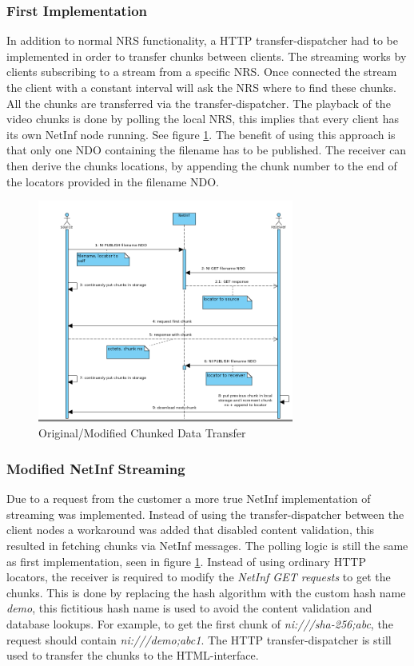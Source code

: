 \subsubsection{First Implementation}
In addition to normal NRS functionality, a HTTP transfer-dispatcher had to be implemented in order to transfer 
chunks between clients. The streaming works by clients subscribing to a stream from a specific NRS. Once connected the 
stream the client with a constant interval will ask the NRS where to find these chunks. All the chunks are transferred 
via the transfer-dispatcher.
The playback of the video chunks is done by polling the local NRS, this implies that every client has its own NetInf 
node running. See figure \ref{fig:stream-seqorgmod}. The benefit of using this approach is that only one NDO containing the 
filename has to be published. The receiver can then derive the chunks locations, by appending the chunk number to the end of 
the locators provided in the filename NDO.

\begin{figure}[h!]
	\centering
		\includegraphics[width=0.75\textwidth]{./img/sequence_diagram_streaming_orgmod.png}
    	\caption{Original/Modified Chunked Data Transfer}
	\label{fig:stream-seqorgmod}
\end{figure}

\subsubsection{Modified NetInf Streaming}
Due to a request from the customer a more true NetInf implementation of streaming was implemented. 
Instead of using the transfer-dispatcher between the client nodes a workaround was added that disabled 
content validation, this resulted in fetching chunks via NetInf messages. The polling logic is still the 
same as first implementation, seen in figure \ref{fig:stream-seqorgmod}. Instead of using ordinary HTTP locators, the 
receiver is required to modify the \textit{NetInf GET requests} to get the chunks. This is done by replacing the 
hash algorithm with the custom hash name \textit{demo}, this fictitious hash name is used to avoid the content validation and database lookups. For example, to get the first chunk of \textit{ni:///sha-256;abc}, 
the request should contain \textit{ni:///demo;abc1}. The HTTP transfer-dispatcher is still used to transfer the chunks to the HTML-interface.

